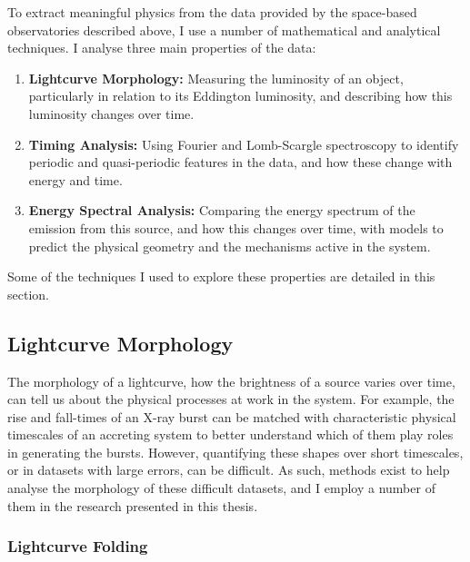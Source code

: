 \par To extract meaningful physics from the data provided by the space-based observatories described above, I use a number of mathematical and analytical techniques.  I analyse three main properties of the data:
\begin{enumerate}
\item \textbf{Lightcurve Morphology:} Measuring the luminosity of an object, particularly in relation to its Eddington luminosity, and describing how this luminosity changes over time.
\item \textbf{Timing Analysis:} Using Fourier and Lomb-Scargle spectroscopy to identify periodic and quasi-periodic features in the data, and how these change with energy and time.
\item \textbf{Energy Spectral Analysis:} Comparing the energy spectrum of the emission from this source, and how this changes over time, with models to predict the physical geometry and the mechanisms active in the system.
\end{enumerate}
\par Some of the techniques I used to explore these properties are detailed in this section.

\subsection{Lightcurve Morphology}

\label{sec:LCMorph}

\par The morphology of a lightcurve, how the brightness of a source varies over time, can tell us about the physical processes at work in the system.  For example, the rise and fall-times of an X-ray burst can be matched with characteristic physical timescales of an accreting system to better understand which of them play roles in generating the bursts.  However, quantifying these shapes over short timescales, or in datasets with large errors, can be difficult.  As such, methods exist to help analyse the morphology of these difficult datasets, and I employ a number of them in the research presented in this thesis.

\subsubsection{Lightcurve Folding}

